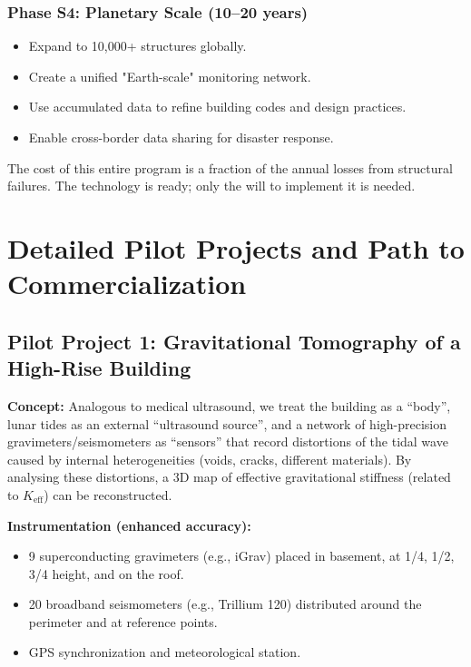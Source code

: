 \documentclass[12pt,a4paper]{article}
\theoremstyle{remark}
\newcommand{\Keff}{K_{\mathrm{eff}}}
\begin{document}
	\subsubsection{Phase S4: Planetary Scale (10–20 years)}
	
	\begin{itemize}
		\item Expand to 10,000+ structures globally.
		\item Create a unified "Earth-scale" monitoring network.
		\item Use accumulated data to refine building codes and design practices.
		\item Enable cross-border data sharing for disaster response.
	\end{itemize}
	
	The cost of this entire program is a fraction of the annual losses from structural failures. The technology is ready; only the will to implement it is needed.
	
	\section{Detailed Pilot Projects and Path to Commercialization}
	
	\subsection{Pilot Project 1: Gravitational Tomography of a High-Rise Building}
	
	\textbf{Concept:} Analogous to medical ultrasound, we treat the building as a ``body'', lunar tides as an external ``ultrasound source'', and a network of high-precision gravimeters/seismometers as ``sensors'' that record distortions of the tidal wave caused by internal heterogeneities (voids, cracks, different materials). By analysing these distortions, a 3D map of effective gravitational stiffness (related to $\Keff$) can be reconstructed.
	
	\textbf{Instrumentation (enhanced accuracy):}
	\begin{itemize}
		\item 9 superconducting gravimeters (e.g., iGrav) placed in basement, at 1/4, 1/2, 3/4 height, and on the roof.
		\item 20 broadband seismometers (e.g., Trillium 120) distributed around the perimeter and at reference points.
		\item GPS synchronization and meteorological station.
	\end{itemize}
	
\end{document}
